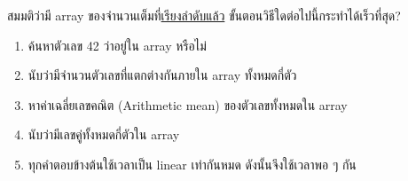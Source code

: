 \question{}

สมมติว่ามี array ของจำนวนเต็มที่\uline{เรียงลำดับแล้ว} ขั้นตอนวิธีใดต่อไปนี้กระทำได้เร็วที่สุด?

\begin{enumerate}[label={$\Circle$}]
\item ค้นหาตัวเลข 42 ว่าอยู่ใน array หรือไม่
\item นับว่ามีจำนวนตัวเลขที่แตกต่างกันภายใน array ทั้งหมดกี่ตัว
\item หาค่าเฉลี่ยเลขคณิต (Arithmetic mean) ของตัวเลขทั้งหมดใน array
\item นับว่ามีเลขคู่ทั้งหมดกี่ตัวใน array
\item ทุกคำตอบข้างต้นใช้เวลาเป็น linear เท่ากันหมด ดังนั้นจึงใช้เวลาพอ ๆ กัน
\end{enumerate}

